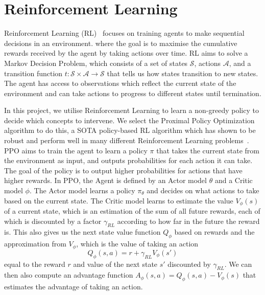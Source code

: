 \section{Reinforcement Learning}\label{background:rl} %
Reinforcement Learning (RL)~\cite{rl} focuses on
 training agents to make sequential decisions in an environment.
where the goal is to maximise the cumulative rewards received by the agent
by taking actions over time. 
RL aims to solve a Markov Decision Problem, which consists of a set of states $\mathcal{S}$, 
actions $\mathcal{A}$, and 
a transition function $t: \mathcal{S} \times \mathcal{A} \to \mathcal{S}$
that tells us how states transition to new states.
The agent has access to observations which reflect the current state
 of the environment and can take actions to progress to different states until termination.

In this project, we utilise Reinforcement Learning 
to learn a non-greedy policy to decide which
concepts to intervene. We select
 the Proximal Policy Optimization~\cite{ppo}
algorithm to do this, a SOTA policy-based RL algorithm which has shown to be robust 
and perform well in many different Reinforcement Learning problems~\cite{ ppo-2, ppo-1, ppo-3}.
PPO aims to train the agent to learn a policy $\pi$ that takes the current state from the environment as input,
and outputs probabilities for each action it can take.
The goal of the policy
is to output higher probabilities for actions that have higher rewards.
In PPO,
the Agent is defined by an Actor model $\theta$ and a Critic model $\phi$.
The Actor model learns a policy $\pi_\theta$ and decides on what actions to take based on 
the current state.
The Critic model learns 
to estimate the value $V_\phi(s)$ of a current state, which is an estimation of the sum of all future rewards, each of which is discounted 
by a factor $\gamma_{RL}$ according to how 
far in the future the reward is.
This also gives us the next state value function $Q_\phi$ 
based on rewards
and the approximation from $V_\phi$,
which is the value of taking an action 
\begin{equation}\label{equation:next-stat-}
Q_\phi(s,a) = 
r + \gamma_{RL} V_\phi(s')
\end{equation}
equal to the reward $r$ and value 
of the next state $s'$ discounted by $\gamma_{RL}$.
We can then also compute
an advantage function $A_\phi(s,a) = Q_\phi(s,a) - V_\phi(s)$
that estimates the advantage of taking an action.

